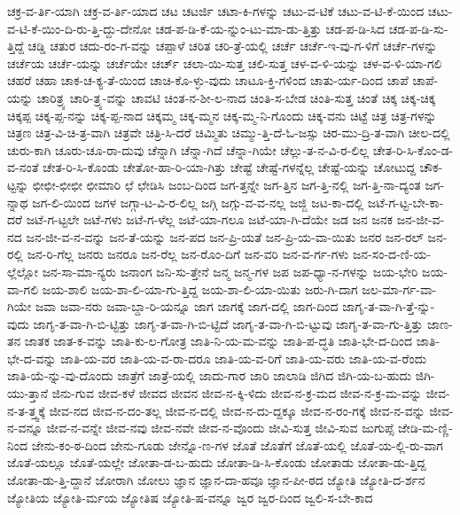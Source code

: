 {ಚಕ್ರ-ವ-ರ್ತಿ-ಯಾಗಿ
ಚಕ್ರ-ವ-ರ್ತಿ-ಯಾದ
ಚಟ
ಚಟರ್ಜಿ
ಚಟಾ-ಕಿ-ಗಳನ್ನು
ಚಟು-ವ-ಟಿಕೆ
ಚಟು-ವ-ಟಿ-ಕೆ-ಯಿಂದ
ಚಟು-ವ-ಟಿ-ಕೆ-ಯಿಂ-ದಿ-ರು-ತ್ತಿ-ದ್ದು-ದೇನೋ
ಚಡ-ಪ-ಡಿ-ಕೆ-ಯ-ನ್ನುಂ-ಟು-ಮಾ-ಡು-ತ್ತಿತ್ತು
ಚಡ-ಪ-ಡಿ-ಸಿದ
ಚಡ-ಪ-ಡಿ-ಸು-ತ್ತಿದ್ದೆ
ಚಡ್ಡಿ
ಚತುರ
ಚದು-ರಂ-ಗ-ವನ್ನು
ಚಪ್ಪಾಳೆ
ಚರಿತ
ಚರಿ-ತ್ರೆ-ಯಲ್ಲಿ
ಚರ್ಚೆ
ಚರ್ಚೆ-ಇ-ವು-ಗ-ಳಿಗೆ
ಚರ್ಚೆ-ಗಳನ್ನು
ಚರ್ಚೆಯ
ಚರ್ಚೆ-ಯನ್ನು
ಚರ್ಚೆಯೇ
ಚರ್ಚ್
ಚಲಾ-ಯಿ-ಸುತ್ತ
ಚಲಿ-ಸುತ್ತ
ಚಳ-ವ-ಳಿ-ಯನ್ನು
ಚಳ-ವ-ಳಿ-ಯಾ-ಗಲಿ
ಚಹರೆ
ಚಹಾ
ಚಾಕ-ಚ-ಕ್ಯ-ತೆ-ಯಿಂದ
ಚಾಚಿ-ಕೊ-ಳ್ಳು-ವುದು
ಚಾಟೂ-ಕ್ತಿ-ಗಳಿಂದ
ಚಾತು-ರ್ಯ-ದಿಂದ
ಚಾಪೆ
ಚಾಪೆ-ಯನ್ನು
ಚಾರಿತ್ರ್ಯ
ಚಾರಿ-ತ್ರ್ಯ-ವನ್ನು
ಚಾವಟಿ
ಚಿಂತ-ನ-ಶೀ-ಲ-ನಾದ
ಚಿಂತಿ-ಸ-ಬೇಡ
ಚಿಂತಿ-ಸುತ್ತ
ಚಿಂತೆ
ಚಿಕ್ಕ
ಚಿಕ್ಕ-ಚಿಕ್ಕ
ಚಿಕ್ಕಪ್ಪ
ಚಿಕ್ಕ-ಪ್ಪ-ನನ್ನು
ಚಿಕ್ಕ-ಪ್ಪ-ನಾದ
ಚಿಕ್ಕಮ್ಮ
ಚಿಕ್ಕ-ಮ್ಮನ
ಚಿಕ್ಕ-ಮ್ಮ-ನಿ-ಗೊಂದು
ಚಿಕ್ಕ-ವನು
ಚಿಟ್ಟೆ
ಚಿತ್ರ
ಚಿತ್ರ-ಗಳನ್ನು
ಚಿತ್ರಣ
ಚಿತ್ರ-ವಿ-ಚಿ-ತ್ರ-ವಾಗಿ
ಚಿತ್ರವೇ
ಚಿತ್ರಿ-ಸಿ-ದರೆ
ಚಿಮ್ಮಿತು
ಚಿಮ್ಮು-ತ್ತಿ-ದೆ-ಓ-ಜಸ್ಸು
ಚಿರ-ಮು-ದ್ರಿ-ತ-ವಾಗಿ
ಚೀಲ-ದಲ್ಲಿ
ಚುರು-ಕಾಗಿ
ಚೂರು-ಚೂ-ರಾ-ದುವು
ಚೆನ್ನಾಗಿ
ಚೆನ್ನಾ-ಗಿದೆ
ಚೆನ್ನಾ-ಗಿಯೇ
ಚೆಲ್ಲು-ತ-ನ-ವಿ-ರ-ಲಿಲ್ಲ
ಚೇತ-ರಿ-ಸಿ-ಕೊಂ-ಡ-ವ-ನಂತೆ
ಚೇತ-ರಿ-ಸಿ-ಕೊಂಡು
ಚೇತೋ-ಹಾ-ರಿ-ಯಾ-ಗಿತ್ತು
ಚೇಷ್ಟೆ
ಚೇಷ್ಟೆ-ಗಳನ್ನೆಲ್ಲ
ಚೇಷ್ಟೆ-ಯನ್ನು
ಚೋಟುದ್ದ
ಚೌಕ-ಟ್ಟನ್ನು
ಛೀಛೀ-ಛೀಛೀ
ಛೀಮಾರಿ
ಛೆ
ಛೇಡಿಸಿ
ಜಂಬ-ದಿಂದ
ಜಗ-ತ್ತನ್ನೇ
ಜಗ-ತ್ತಿನ
ಜಗ-ತ್ತಿ-ನಲ್ಲಿ
ಜಗ-ತ್ತಿ-ನಾ-ದ್ಯಂತ
ಜಗ-ನ್ನಾಥ
ಜಗ-ಲಿ-ಯಿಂದ
ಜಗಳ
ಜಗ್ಗಾ-ಟ-ವಿ-ರ-ಲಿಲ್ಲ
ಜಗ್ಗಿ
ಜಗ್ಗು-ವ-ವ-ನಲ್ಲ
ಜಜ್ಜಿ
ಜಟ-ಕಾ-ದಲ್ಲಿ
ಜಟೆ-ಗ-ಟ್ಟ-ಬೇ-ಕಾ-ದರೆ
ಜಟೆ-ಗ-ಟ್ಟಲೇ
ಜಟೆ-ಗಳು
ಜಟೆ-ಗ-ಳೆಲ್ಲ
ಜಟೆ-ಯಾ-ಗಲೂ
ಜಟೆ-ಯಾ-ಗಿ-ದೆಯೇ
ಜಡ
ಜನ
ಜನಕ
ಜನ-ಜೀ-ವ-ನದ
ಜನ-ಜೀ-ವ-ನ-ವನ್ನು
ಜನ-ತೆ-ಯನ್ನು
ಜನ-ಪದ
ಜನ-ಪ್ರಿ-ಯತೆ
ಜನ-ಪ್ರಿ-ಯ-ವಾ-ಯಿತು
ಜನರ
ಜನ-ರಲ್
ಜನ-ರಲ್ಲಿ
ಜನ-ರಿ-ಗೆಲ್ಲ
ಜನರು
ಜನರೂ
ಜನ-ರೆಲ್ಲ
ಜನ-ರೊಂ-ದಿಗೆ
ಜನ-ವರಿ
ಜನ-ವ-ರ್ಗ-ಗಳು
ಜನ-ಸಂ-ದ-ಣಿ-ಯ-ಲ್ಲೆಲ್ಲೋ
ಜನ-ಸಾ-ಮಾ-ನ್ಯರು
ಜನಾಂಗ
ಜನಿ-ಸು-ತ್ತೇನೆ
ಜನ್ಮ
ಜನ್ಮ-ಗಳ
ಜಪ
ಜಪ-ಧ್ಯಾ-ನ-ಗಳನ್ನು
ಜಯ-ಭೇರಿ
ಜಯ-ವಾ-ಗಲಿ
ಜಯ-ಶಾಲಿ
ಜಯ-ಶಾ-ಲಿ-ಯಾ-ಗು-ತ್ತಿದ್ದ
ಜಯ-ಶಾ-ಲಿ-ಯಾ-ಯಿತು
ಜರು-ಗಿ-ದಾಗ
ಜಲ-ಮಾ-ರ್ಗ-ವಾ-ಗಿಯೇ
ಜವಾ
ಜವಾ-ನರು
ಜವಾ-ಬ್ದಾ-ರಿ-ಯನ್ನೂ
ಜಾಗ
ಜಾಗಕ್ಕೆ
ಜಾಗ-ದಲ್ಲಿ
ಜಾಗ-ದಿಂದ
ಜಾಗೃ-ತ-ವಾ-ಗಿ-ತ್ತೆ-ನ್ನು-ವುದು
ಜಾಗೃ-ತ-ವಾ-ಗಿ-ಬಿ-ಟ್ಟಿತ್ತು
ಜಾಗೃ-ತ-ವಾ-ಗಿ-ಬಿ-ಟ್ಟಿದೆ
ಜಾಗೃ-ತ-ವಾ-ಗಿ-ಬಿ-ಟ್ಟುವು
ಜಾಗೃ-ತ-ವಾ-ಗು-ತ್ತಿತ್ತು
ಜಾಣ-ತನ
ಜಾತಕ
ಜಾತ-ಕ-ವನ್ನು
ಜಾತಿ-ಕು-ಲ-ಗೋತ್ರ
ಜಾತಿ-ನಿ-ಯ-ಮ-ವನ್ನು
ಜಾತಿ-ಪ-ದ್ಧತಿ
ಜಾತಿ-ಭೇ-ದ-ದಿಂದ
ಜಾತಿ-ಭೇ-ದ-ವನ್ನು
ಜಾತಿ-ಯ-ವರ
ಜಾತಿ-ಯ-ವ-ರಾ-ದರೂ
ಜಾತಿ-ಯ-ವ-ರಿಗೆ
ಜಾತಿ-ಯ-ವರು
ಜಾತಿ-ಯ-ವ-ರೆಂದು
ಜಾತಿ-ಯೆ-ನ್ನು-ವು-ದೊಂದು
ಜಾತ್ರೆಗೆ
ಜಾತ್ರೆ-ಯಲ್ಲಿ
ಜಾದು-ಗಾರ
ಜಾರಿ
ಜಾಲಾಡಿ
ಜಿಗಿದ
ಜಿಗಿ-ಯ-ಬ-ಹುದು
ಜಿಗಿ-ಯು-ತ್ತಾನೆ
ಜಿನು-ಗುವ
ಜೀವ-ಕಳೆ
ಜೀವದ
ಜೀವನ
ಜೀವ-ನ-ಕ್ಕಿ-ಳಿದು
ಜೀವ-ನ-ಕ್ರ-ಮದ
ಜೀವ-ನ-ಕ್ರ-ಮ-ವನ್ನು
ಜೀವ-ನ-ತ-ತ್ತ್ವಕ್ಕೆ
ಜೀವ-ನದ
ಜೀವ-ನ-ದಂ-ತಲ್ಲ
ಜೀವ-ನ-ದಲ್ಲಿ
ಜೀವ-ನ-ದು-ದ್ದಕ್ಕೂ
ಜೀವ-ನ-ರಂ-ಗಕ್ಕೆ
ಜೀವ-ನ-ವನ್ನು
ಜೀವ-ನ-ವನ್ನೂ
ಜೀವ-ನ-ವನ್ನೇ
ಜೀವ-ನವು
ಜೀವ-ನವೇ
ಜೀವ-ನ-ವೊಂದು
ಜೀವಿ-ಸುತ್ತ
ಜೀವಿ-ಸುವ
ಜುಗುಪ್ಸೆ
ಜೇಡಿ-ಮ-ಣ್ಣಿ-ನಿಂದ
ಜೇನು-ಕಂ-ಠ-ದಿಂದ
ಜೇನು-ಗೂಡು
ಜೇನ್ನೊ-ಣ-ಗಳ
ಜೊತೆ
ಜೊತೆಗೆ
ಜೊತೆ-ಯಲ್ಲಿ
ಜೊತೆ-ಯ-ಲ್ಲಿ-ರು-ವಾಗ
ಜೊತೆ-ಯಲ್ಲೂ
ಜೊತೆ-ಯಲ್ಲೇ
ಜೋತಾ-ಡ-ಬ-ಹುದು
ಜೋತಾ-ಡಿ-ಸಿ-ಕೊಂಡು
ಜೋತಾಡು
ಜೋತಾ-ಡು-ತ್ತಿದ್ದ
ಜೋತಾ-ಡು-ತ್ತಿ-ದ್ದಾನೆ
ಜೋರಾಗಿ
ಜೋಲು
ಜ್ಞಾನ
ಜ್ಞಾನ-ದಾ-ಹವೂ
ಜ್ಞಾನ-ಪೀ-ಠದ
ಜ್ಯೋತಿ
ಜ್ಯೋತಿ-ದ-ರ್ಶನ
ಜ್ಯೋತಿಯ
ಜ್ಯೋತಿ-ರ್ಮಯ
ಜ್ಯೋತಿಷ
ಜ್ಯೋತಿ-ಷ-ವನ್ನೂ
ಜ್ವರ
ಜ್ವರ-ದಿಂದ
ಜ್ವಲಿ-ಸ-ಬೇ-ಕಾದ
}
